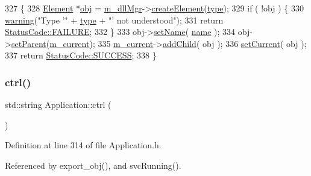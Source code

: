 \begin{DoxyCode}
327 \{
328   \hyperlink{classElement}{Element} *\hyperlink{namespaceshell_a7c2aab80550f476d91e0d8f0c350a635}{obj} = \hyperlink{classApplication_a66b06cbeb824fe00ecd11499fcf01c55}{m\_dllMgr}->\hyperlink{classDLLMgr_a8cc61eaf98a6aa3cb99fee7226477053}{createElement}(\hyperlink{classObject_a84f99f70f144a83e1582d1d0f84e4e62}{type});
329   \textcolor{keywordflow}{if} ( !obj ) \{
330     \hyperlink{classObject_a65cd4fda577711660821fd2cd5a3b4c9}{warning}(\textcolor{stringliteral}{"Type '"} + \hyperlink{classObject_a84f99f70f144a83e1582d1d0f84e4e62}{type} + \textcolor{stringliteral}{"'  not understood"});
331     \textcolor{keywordflow}{return} \hyperlink{classStatusCode_a6f565cbeadc76d14c72f047e5e85eb4ba3da73d4c469762eb9d3c960368252b26}{StatusCode::FAILURE};
332   \}
333   obj->\hyperlink{classObject_ae30fea75683c2d149b6b6d17c09ecd0c}{setName}( \hyperlink{classObject_a300f4c05dd468c7bb8b3c968868443c1}{name} );
334   obj->\hyperlink{classHierarchy_a585ad1aeec16077a0e532ab8b4fc557b}{setParent}(\hyperlink{classApplication_ab0fd877a3c66c41b22109863e1719ccd}{m\_current});
335   \hyperlink{classApplication_ab0fd877a3c66c41b22109863e1719ccd}{m\_current}->\hyperlink{classHierarchy_ad677774ff38fcb257c04a3a10d471fac}{addChild}( obj );
336   \hyperlink{classApplication_a0f0a9e376d9f1716e01e86c94ae3499f}{setCurrent}( obj );
337   \textcolor{keywordflow}{return} \hyperlink{classStatusCode_a6f565cbeadc76d14c72f047e5e85eb4badd0da38d3ba0d922efd1f4619bc37ad8}{StatusCode::SUCCESS};
338 \}
\end{DoxyCode}
\mbox{\label{classApplication_a3eb11c9a1985a3a9d2ec51df957f7c2f}} 
\subsubsection{\texorpdfstring{ctrl()}{ctrl()}}
{\footnotesize\ttfamily std\+::string Application\+::ctrl (\begin{DoxyParamCaption}{ }\end{DoxyParamCaption})\hspace{0.3cm}{\ttfamily [inline]}}



Definition at line 314 of file Application.\+h.



Referenced by export\+\_\+obj(), and svc\+Running().


